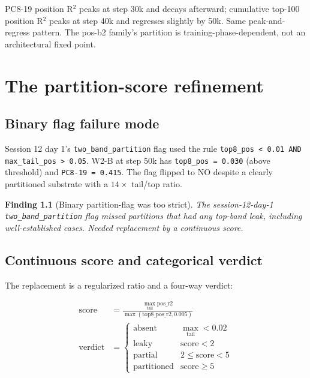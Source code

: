 \documentclass[11pt,openany]{book}
\newtheorem{finding}{Finding}[chapter]
\begin{document}
PC8-19 position R$^2$ peaks at step 30k and decays afterward; cumulative
top-100 position R$^2$ peaks at step 40k and regresses slightly by 50k. Same
peak-and-regress pattern. The pos-b2 family's partition is
training-phase-dependent, not an architectural fixed point.

\chapter{The partition-score refinement}

\section{Binary flag failure mode}

Session 12 day 1's \texttt{two\_band\_partition} flag used the rule
\texttt{top8\_pos < 0.01 AND max\_tail\_pos > 0.05}. W2-B at step 50k has
\texttt{top8\_pos = 0.030} (above threshold) and \texttt{PC8-19 = 0.415}.
The flag flipped to NO despite a clearly partitioned substrate with a
$14\times$ tail/top ratio.

\begin{finding}[Binary partition-flag was too strict]
The session-12-day-1 \texttt{two\_band\_partition} flag missed partitions
that had any top-band leak, including well-established cases. Needed
replacement by a continuous score.
\end{finding}

\section{Continuous score and categorical verdict}

The replacement is a regularized ratio and a four-way verdict:

\begin{align*}
    \mathrm{score} &= \frac{\max_{\mathrm{tail}}\mathrm{pos\_r2}}%
                          {\max(\mathrm{top8\_pos\_r2}, 0.005)} \\
    \mathrm{verdict} &= \begin{cases}
        \text{absent}      & \max_{\mathrm{tail}} < 0.02 \\
        \text{leaky}       & \text{score} < 2 \\
        \text{partial}     & 2 \leq \text{score} < 5 \\
        \text{partitioned} & \text{score} \geq 5
    \end{cases}
\end{align*}
\end{document}
